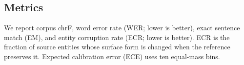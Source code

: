 \subsection{Metrics}

We report corpus chrF, word error rate (WER; lower is better), exact sentence
match (EM), and entity corruption rate (ECR; lower is better). ECR is the
fraction of source entities whose surface form is changed when the reference
preserves it. Expected calibration error (ECE) uses ten equal-mass bins.

